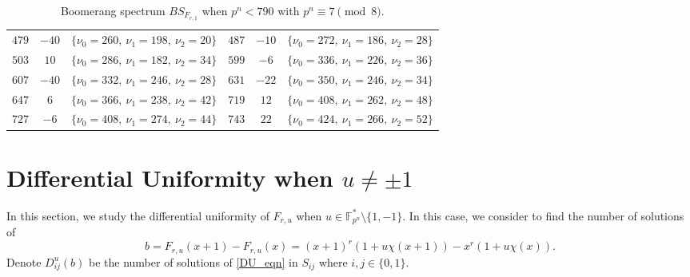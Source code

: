 \documentclass[11pt]{article}
\numberwithin{theorem}{section}
\newcommand{\Fpnmul}{\mathbb{F}_{p^n}^*}
\begin{document}
\begin{table}
\begin{center}
\begin{tabular}{ccc|ccc}
			$479$ & $-40$ &  $\{ \nu_0 = 260,\ \nu_1 = 198,\ \nu_2 = 20 \}$ & $487$ & $-10$ &  $\{ \nu_0 = 272,\ \nu_1 = 186,\ \nu_2 = 28 \}$\\
			$503$ & $10$ &  $\{ \nu_0 = 286,\ \nu_1 = 182,\ \nu_2 = 34 \}$ & $599$ & $-6$ &  $\{ \nu_0 = 336,\ \nu_1 = 226,\ \nu_2 = 36 \}$\\
			$607$ & $-40$ &  $\{ \nu_0 = 332,\ \nu_1 = 246,\ \nu_2 = 28 \}$ & $631$ & $-22$ &  $\{ \nu_0 = 350,\ \nu_1 = 246,\ \nu_2 = 34 \}$\\
			$647$ & $6$ &  $\{ \nu_0 = 366,\ \nu_1 = 238,\ \nu_2 = 42 \}$ & $719$ & $12$ &  $\{ \nu_0 = 408,\ \nu_1 = 262,\ \nu_2 = 48 \}$\\
			$727$ & $-6$ &  $\{ \nu_0 = 408,\ \nu_1 = 274,\ \nu_2 = 44 \}$ & $743$ & $22$ &  $\{ \nu_0 = 424,\ \nu_1 = 266,\ \nu_2 = 52 \}$\\
			\hline
		\end{tabular}
		\caption{Boomerang spectrum $BS_{F_{r,1}}$ when $p^n < 790$ with $p^n \equiv 7 \pmod{8}$.}\label{table_bs}
	\end{center}
\end{table}

















\section{Differential Uniformity when $u\ne \pm 1$}\label{sec u!=pm1}

In this section, we study the differential uniformity of $F_{r,u}$ when $u \in \Fpnmul \setminus \{1, -1\}$. In this case, we consider to find the number of solutions of 
\begin{equation}\label{DU_eqn}
	b=F_{r,u}(x+1)-F_{r,u}(x) = (x+1)^r(1+u\chi(x+1)) - x^r (1+u\chi(x)).
\end{equation}
Denote $D_{ij}^u(b)$ be the number of solutions of \eqref{DU_eqn} in $S_{ij}$ where $i,j\in\{0,1\}$.
\end{document}

